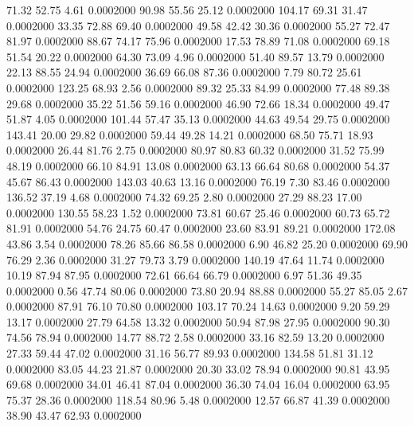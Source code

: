   71.32   52.75    4.61   0.0002000
  90.98   55.56   25.12   0.0002000
 104.17   69.31   31.47   0.0002000
  33.35   72.88   69.40   0.0002000
  49.58   42.42   30.36   0.0002000
  55.27   72.47   81.97   0.0002000
  88.67   74.17   75.96   0.0002000
  17.53   78.89   71.08   0.0002000
  69.18   51.54   20.22   0.0002000
  64.30   73.09    4.96   0.0002000
  51.40   89.57   13.79   0.0002000
  22.13   88.55   24.94   0.0002000
  36.69   66.08   87.36   0.0002000
   7.79   80.72   25.61   0.0002000
 123.25   68.93    2.56   0.0002000
  89.32   25.33   84.99   0.0002000
  77.48   89.38   29.68   0.0002000
  35.22   51.56   59.16   0.0002000
  46.90   72.66   18.34   0.0002000
  49.47   51.87    4.05   0.0002000
 101.44   57.47   35.13   0.0002000
  44.63   49.54   29.75   0.0002000
 143.41   20.00   29.82   0.0002000
  59.44   49.28   14.21   0.0002000
  68.50   75.71   18.93   0.0002000
  26.44   81.76    2.75   0.0002000
  80.97   80.83   60.32   0.0002000
  31.52   75.99   48.19   0.0002000
  66.10   84.91   13.08   0.0002000
  63.13   66.64   80.68   0.0002000
  54.37   45.67   86.43   0.0002000
 143.03   40.63   13.16   0.0002000
  76.19    7.30   83.46   0.0002000
 136.52   37.19    4.68   0.0002000
  74.32   69.25    2.80   0.0002000
  27.29   88.23   17.00   0.0002000
 130.55   58.23    1.52   0.0002000
  73.81   60.67   25.46   0.0002000
  60.73   65.72   81.91   0.0002000
  54.76   24.75   60.47   0.0002000
  23.60   83.91   89.21   0.0002000
 172.08   43.86    3.54   0.0002000
  78.26   85.66   86.58   0.0002000
   6.90   46.82   25.20   0.0002000
  69.90   76.29    2.36   0.0002000
  31.27   79.73    3.79   0.0002000
 140.19   47.64   11.74   0.0002000
  10.19   87.94   87.95   0.0002000
  72.61   66.64   66.79   0.0002000
   6.97   51.36   49.35   0.0002000
   0.56   47.74   80.06   0.0002000
  73.80   20.94   88.88   0.0002000
  55.27   85.05    2.67   0.0002000
  87.91   76.10   70.80   0.0002000
 103.17   70.24   14.63   0.0002000
   9.20   59.29   13.17   0.0002000
  27.79   64.58   13.32   0.0002000
  50.94   87.98   27.95   0.0002000
  90.30   74.56   78.94   0.0002000
  14.77   88.72    2.58   0.0002000
  33.16   82.59   13.20   0.0002000
  27.33   59.44   47.02   0.0002000
  31.16   56.77   89.93   0.0002000
 134.58   51.81   31.12   0.0002000
  83.05   44.23   21.87   0.0002000
  20.30   33.02   78.94   0.0002000
  90.81   43.95   69.68   0.0002000
  34.01   46.41   87.04   0.0002000
  36.30   74.04   16.04   0.0002000
  63.95   75.37   28.36   0.0002000
 118.54   80.96    5.48   0.0002000
  12.57   66.87   41.39   0.0002000
  38.90   43.47   62.93   0.0002000
